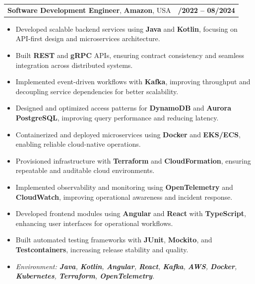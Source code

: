 \documentclass[letterpaper,11pt]{article}
\makeatletter
\newcommand{\resumeItem}[1]{
  \item\footnotesize{
    {#1 \vspace{-2pt}}
  }
}
\newcommand{\resumeSubheading}[4]{
  \vspace{-2pt}\item
    \begin{tabular*}{1.0\textwidth}[t]{l@{\extracolsep{\fill}}r}
      \textbf{\fontsize{10pt}{14pt}\selectfont #3}, \textbf{\fontsize{10pt}{14pt}\selectfont #1}, \fontsize{10pt}{14pt}\selectfont #4 & \textbf{\fontsize{10pt}{14pt}\selectfont #2} \\
    \end{tabular*}\vspace{-7pt}
}
\newcommand{\resumeItemListStart}{\begin{itemize}[leftmargin=*]}
\newcommand{\resumeItemListEnd}{\end{itemize}\vspace{-5pt}}
\makeatother
\begin{document}
\resumeSubheading
{Amazon}{10/2022 -- 08/2024}
{Software Development Engineer}{USA}
\resumeItemListStart
  \resumeItem{Developed scalable backend services using \textbf{Java} and \textbf{Kotlin}, focusing on API-first design and microservices architecture.}
  \resumeItem{Built \textbf{REST} and \textbf{gRPC} APIs, ensuring contract consistency and seamless integration across distributed systems.}
  \resumeItem{Implemented event-driven workflows with \textbf{Kafka}, improving throughput and decoupling service dependencies for better scalability.}
  \resumeItem{Designed and optimized access patterns for \textbf{DynamoDB} and \textbf{Aurora PostgreSQL}, improving query performance and reducing latency.}
  \resumeItem{Containerized and deployed microservices using \textbf{Docker} and \textbf{EKS/ECS}, enabling reliable cloud-native operations.}
  \resumeItem{Provisioned infrastructure with \textbf{Terraform} and \textbf{CloudFormation}, ensuring repeatable and auditable cloud environments.}
  \resumeItem{Implemented observability and monitoring using \textbf{OpenTelemetry} and \textbf{CloudWatch}, improving operational awareness and incident response.}
  \resumeItem{Developed frontend modules using \textbf{Angular} and \textbf{React} with \textbf{TypeScript}, enhancing user interfaces for operational workflows.}
  \resumeItem{Built automated testing frameworks with \textbf{JUnit}, \textbf{Mockito}, and \textbf{Testcontainers}, increasing release stability and quality.}
  \resumeItem{\textit{Environment: \textbf{Java}, \textbf{Kotlin}, \textbf{Angular}, \textbf{React}, \textbf{Kafka}, \textbf{AWS}, \textbf{Docker}, \textbf{Kubernetes}, \textbf{Terraform}, \textbf{OpenTelemetry}.}}
\resumeItemListEnd
\end{document}
